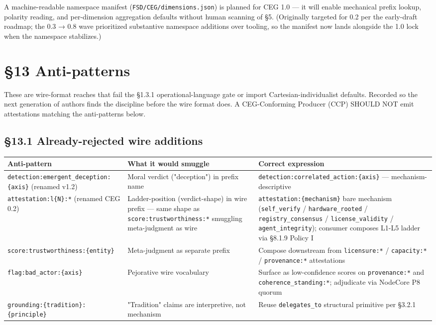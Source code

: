 \documentclass[11pt]{article}
\begin{document}
A machine-readable namespace manifest (\texttt{FSD/CEG/dimensions.json}) is planned for CEG 1.0 — it will enable mechanical prefix lookup, polarity reading, and per-dimension aggregation defaults without human scanning of §5. (Originally targeted for 0.2 per the early-draft roadmap; the 0.3 → 0.8 wave prioritized substantive namespace additions over tooling, so the manifest now lands alongside the 1.0 lock when the namespace stabilizes.)




\clearpage


\section*{§13 Anti-patterns}


These are wire-format reaches that fail the §1.3.1 operational-language gate or import Cartesian-individualist defaults. Recorded so the next generation of authors finds the discipline before the wire format does. A CEG-Conforming Producer (CCP) SHOULD NOT emit attestations matching the anti-patterns below.


\subsection*{§13.1 Already-rejected wire additions}


{\footnotesize
\begin{longtable}{|p{5.33cm}|p{5.33cm}|p{5.33cm}|}\hline
\textbf{Anti-pattern} & \textbf{What it would smuggle} & \textbf{Correct expression} \\ \hline\endhead
\texttt{detection:emergent\_deception:\{axis\}} (renamed v1.2) & Moral verdict ("deception") in prefix name & \texttt{detection:correlated\_action:\{axis\}} — mechanism-descriptive \\ \hline
\texttt{attestation:l\{N\}:*} (renamed CEG 0.2) & Ladder-position (verdict-shape) in wire prefix — same shape as \texttt{score:trustworthiness:*} smuggling meta-judgment as wire & \texttt{attestation:\{mechanism\}} bare mechanism (\texttt{self\_verify} / \texttt{hardware\_rooted} / \texttt{registry\_consensus} / \texttt{license\_validity} / \texttt{agent\_integrity}); consumer composes L1-L5 ladder via §8.1.9 Policy I \\ \hline
\texttt{score:trustworthiness:\{entity\}} & Meta-judgment as separate prefix & Compose downstream from \texttt{licensure:*} / \texttt{capacity:*} / \texttt{provenance:*} attestations \\ \hline
\texttt{flag:bad\_actor:\{axis\}} & Pejorative wire vocabulary & Surface as low-confidence scores on \texttt{provenance:*} and \texttt{coherence\_standing:*}; adjudicate via NodeCore P8 quorum \\ \hline
\texttt{grounding:\{tradition\}:\{principle\}} & "Tradition" claims are interpretive, not mechanism & Reuse \texttt{delegates\_to} structural primitive per §3.2.1 \\ \hline
\end{longtable}}
\end{document}

